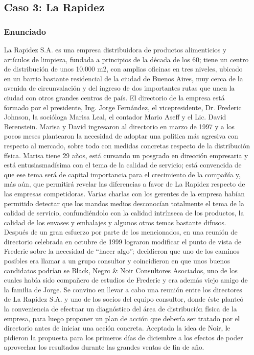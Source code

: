 \documentclass[a4paper,10pt]{article}
\begin{document}
	\subsection{Caso 3: La Rapidez}
	\subsubsection{Enunciado}
	La Rapidez S.A. es una empresa distribuidora de productos alimenticios y artículos de limpieza, fundada a principios de la década de los 60; tiene un centro de distribución de unos 10.000 m2, con amplias oficinas en tres niveles, ubicado en un barrio bastante residencial de la ciudad de Buenos Aires, muy cerca de la avenida de circunvalación y del ingreso de dos importantes rutas que unen la ciudad con otros grandes centros de país. El directorio de la empresa está formado por el presidente, Ing. Jorge Fernández, el vicepresidente, Dr. Frederic Johnson, la socióloga Marisa Leal, el contador Mario Aseff y el Lic. David Berenstein. Marisa y David ingresaron al directorio en marzo de 1997 y a los pocos meses plantearon la necesidad de adoptar una política más agresiva con respecto al mercado, sobre todo con medidas concretas respecto de la distribución física. Marisa tiene 29 años, está cursando un posgrado en dirección empresaria y está entusiasmadísima con el  tema de la calidad de servicio; está convencida de que ese tema será de capital importancia para el crecimiento de la compañía y, más aún, que permitirá revelar las diferencias a favor de La Rapidez respecto de las empresas competidoras. Varias charlas con los gerentes de la empresa habían permitido detectar que los mandos medios desconocían totalmente el tema de la calidad de servicio, confundiéndolo con la calidad intrínseca de los productos, la calidad de los envases y embalajes y algunos otros temas bastante difusos.\\Después de un gran esfuerzo por parte de los mencionados, en una reunión de directorio celebrada en octubre de 1999 lograron modificar el punto de vista de Frederic sobre la necesidad de “hacer algo”; decidieron que uno de los caminos posibles era llamar a un grupo consultor y coincidieron en que unos buenos candidatos podrían se Black, Negro \& Noir Consultores Asociados, uno de los cuales había sido compañero de estudios de Frederic y era además viejo amigo de la familia de Jorge. Se convino en llevar a cabo una reunión entre los directores de La Rapidez S.A. y uno de los socios del equipo consultor, donde éste planteó la conveniencia de efectuar un diagnóstico del área de distribución física de la empresa, para luego proponer un plan de acción que debería ser tratado por el directorio antes de iniciar una acción concreta. Aceptada la idea de Noir, le pidieron la propuesta para los primeros días de diciembre a los efectos de poder aprovechar los resultados durante las grandes ventas de fin de año.\\
\end{document}
